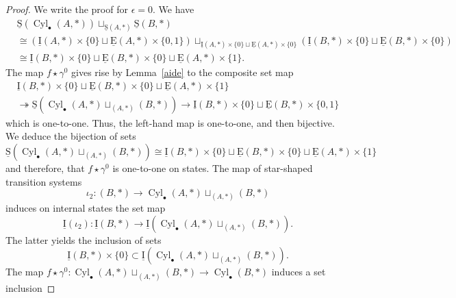 \documentclass[a4paper,12pt]{amsart}
\begin{document}
\begin{proof} We write the proof for $\epsilon = 0$.  We have
\begin{align*}
&\operatorname{\underline{S}}(\operatorname{{Cyl}}_\bullet(A,*)) \sqcup_{\operatorname{\underline{S}}(A,*)} \operatorname{\underline{S}}(B,*) \\
&{\cong} \left(\operatorname{\underline{I}}(A,*)\times\{0\} \sqcup \operatorname{\underline{E}}(A,*)\times\{0,1\}\right) \sqcup_{\operatorname{\underline{I}}(A,*)\times \{0\} \sqcup \operatorname{\underline{E}}(A,*)\times\{0\}} \left(\operatorname{\underline{I}}(B,*)\times\{0\}\sqcup \operatorname{\underline{E}}(B,*)\times\{0\}\right) \\
& {\cong} \operatorname{\underline{I}}(B,*)\times\{0\} \sqcup \operatorname{\underline{E}}(B,*)\times\{0\} \sqcup \operatorname{\underline{E}}(A,*)\times\{1\}.
\end{align*}
The map $f\star \gamma^0$ gives rise by Lemma~\ref{aide} to the
composite set map
\begin{multline*}\operatorname{\underline{I}}(B,*)\times\{0\} \sqcup \operatorname{\underline{E}}(B,*)\times\{0\} \sqcup \operatorname{\underline{E}}(A,*)\times\{1\} \\\twoheadrightarrow \operatorname{\underline{S}}\left(\operatorname{{Cyl}}_\bullet(A,*)
    \sqcup_{(A,*)} (B,*)\right) \longrightarrow \operatorname{\underline{I}}(B,*)\times\{0\}
  \sqcup \operatorname{\underline{E}}(B,*)\times\{0,1\}\end{multline*} which is one-to-one. Thus,
the left-hand map is one-to-one, and then bijective.  We deduce the
bijection of sets
\[\operatorname{\underline{S}}\left(\operatorname{{Cyl}}_\bullet(A,*)
  \sqcup_{(A,*)} (B,*)\right) {\cong} \operatorname{\underline{I}}(B,*)\times\{0\} \sqcup
\operatorname{\underline{E}}(B,*)\times\{0\} \sqcup \operatorname{\underline{E}}(A,*)\times\{1\}\] and therefore, that $f\star
\gamma^0$ is one-to-one on states. The map of star-shaped
transition systems \[\iota_2:(B,*) \to
\operatorname{{Cyl}}_\bullet(A,*) \sqcup_{(A,*)} (B,*)\] induces on internal states 
the set map 
\[\operatorname{\underline{I}}(\iota_2):\operatorname{\underline{I}}(B,*) \longrightarrow 
\operatorname{\underline{I}}(\operatorname{{Cyl}}_\bullet(A,*) \sqcup_{(A,*)} (B,*)).\] The latter yields the
inclusion of sets \[\operatorname{\underline{I}}(B,*) \times \{0\} \subset \operatorname{\underline{I}}(\operatorname{{Cyl}}_\bullet(A,*)
\sqcup_{(A,*)} (B,*)).\] The map $f \star \gamma^0:\operatorname{{Cyl}}_\bullet(A,*)
\sqcup_{(A,*)} (B,*) \to \operatorname{{Cyl}}_\bullet(B,*)$ induces a set inclusion

\end{proof}
\end{document}
